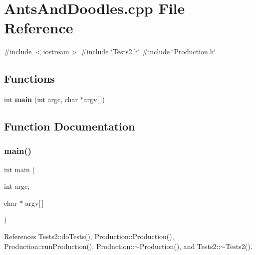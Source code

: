 \section{Ants\+And\+Doodles.\+cpp File Reference}
\label{AntsAndDoodles_8cpp}
{\ttfamily \#include $<$iostream$>$}\newline
{\ttfamily \#include \char`\"{}Tests2.\+h\char`\"{}}\newline
{\ttfamily \#include \char`\"{}Production.\+h\char`\"{}}\newline
\subsection*{Functions}
\begin{DoxyCompactItemize}
\item 
int \textbf{ main} (int argc, char $\ast$argv[$\,$])
\end{DoxyCompactItemize}


\subsection{Function Documentation}
\mbox{\label{AntsAndDoodles_8cpp_a0ddf1224851353fc92bfbff6f499fa97}} 
\subsubsection{main()}
{\footnotesize\ttfamily int main (\begin{DoxyParamCaption}\item[{int}]{argc,  }\item[{char $\ast$}]{argv[$\,$] }\end{DoxyParamCaption})}



References Tests2\+::do\+Tests(), Production\+::\+Production(), Production\+::run\+Production(), Production\+::$\sim$\+Production(), and Tests2\+::$\sim$\+Tests2().


